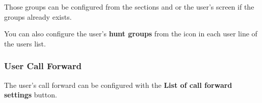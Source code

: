 \documentclass[letterpaper,10pt,english]{sphinxmanual}
\begin{document}
Those groups can be configured from the sections {\hyperref[administration_portal/client/vpbx/routing_endpoints/hunt_groups:huntgroups]{}} and
{\hyperref[administration_portal/client/vpbx/user_configuration/pick_up_groups:capture\string-groups]{}} or the user's screen if the groups already exists.

You can also configure the user's \textbf{hunt groups} from the icon in each user
line of the users list.


\subsubsection{User Call Forward}
\label{administration_portal/client/vpbx/users:user-call-forward}
The user's call forward can be configured with the \textbf{List of call forward settings}  button.
\end{document}
